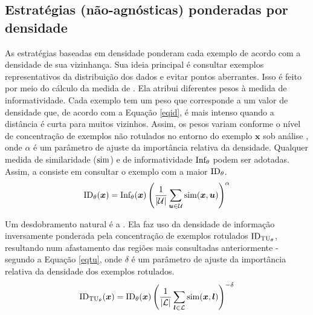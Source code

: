 \subsection{Estratégias (não-agnósticas) ponderadas por densidade}\label{dw}
As estratégias baseadas em densidade ponderam cada exemplo de acordo com a densidade de sua vizinhança.
Sua ideia principal é consultar exemplos representativos da distribuição dos dados e evitar pontos aberrantes.
Isso é feito por meio do cálculo da medida de .
Ela atribui diferentes pesos à medida de informatividade.
Cada exemplo tem um peso que corresponde a um valor de densidade que, de acordo com a Equação \ref{eqid}, é mais intenso quando a distância é curta para muitos vizinhos.
Assim, os pesos variam conforme o nível de concentração de exemplos não rotulados no entorno do exemplo $\bm{x}$ sob análise \cite{settles2008curious}, onde $\alpha$ é um parâmetro de ajuste da importância relativa da densidade.
Qualquer medida de similaridade ($\operatorname*{sim}$) e de informatividade $\operatorname*{Inf_\theta}$ podem ser adotadas.
Assim, a  consiste em consultar o exemplo com a maior $\operatorname*{ID_\theta}$.
\begin{equation}\label{eqid}
 \operatorname*{ID_\theta}(\bm{x}) = \operatorname*{Inf_\theta}(\bm{x})
 \left(\frac{1}{|\mathcal{U}|} \sum_{\bm{u} \in \mathcal{U}} \operatorname*{sim}(\bm{x},\bm{u})\right)^\alpha
\end{equation}

Um desdobramento natural é a .
Ela faz uso da densidade de informação inversamente ponderada pela concentração de exemplos rotulados $\operatorname*{ID_{TU_\theta}}$, resultando num afastamento das regiões mais consultadas anteriormente \cite{settles2010active,journals/coling/FujiiITT98} - segundo a Equação \ref{eqtu}, onde $\delta$ é um parâmetro de ajuste da importância relativa da densidade dos exemplos rotulados.
\begin{equation}\label{eqtu}
 \operatorname*{ID_{TU_\theta}}(\bm{x}) = \operatorname*{ID_\theta}(\bm{x}) 
 \left(\frac{1}{|\mathcal{L}|}
 \sum_{\bm{l} \in \mathcal{L}} \operatorname*{sim}(\bm{x},\bm{l})\right)^{-\delta}
\end{equation}

